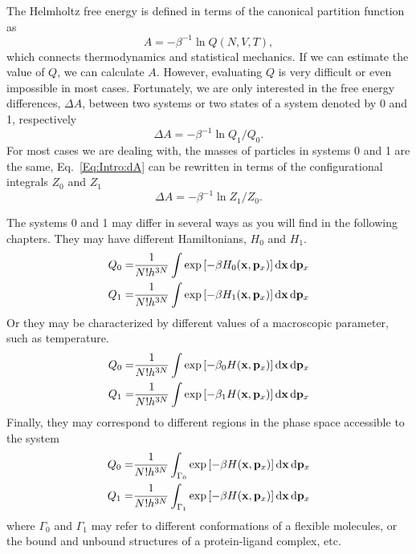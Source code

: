 The Helmholtz free energy is defined in terms of the canonical partition function as
\begin{equation}
A=-\beta^{-1}\ln{Q(N,V,T)},
\end{equation}
which connects thermodynamics and statistical mechanics. If we can estimate the value of $Q$, we can calculate $A$. However, evaluating $Q$ is very difficult or even impossible in most cases. Fortunately, we are only interested in the free energy differences, $\Delta A$, between two systems or two states of a system denoted by 0 and 1, respectively
\begin{equation}
\Delta A=-\beta^{-1}\ln{Q_1/Q_0}.
\label{Eq:Intro:dA}
\end{equation}
For most cases we are dealing with, the masses of particles in systems 0 and 1 are the same, Eq.~\ref{Eq:Intro:dA} can be rewritten in terms of the configurational integrals $Z_0$ and $Z_1$
\begin{equation}
\Delta A=-\beta^{-1}\ln{Z_1/Z_0}.
\end{equation}

The systems 0 and 1 may differ in several ways as you will find in the following chapters. They may have different Hamiltonians, $H_0$ and $H_1$. 
\begin{align}
	Q_0=&\frac{1}{N!h^{3N}}\int\exp{\left[-\beta H_0(\mathbf{x},\mathbf{p}_x)\right]}\mathop{}\!\mathrm{d} \mathbf{x}\mathop{}\!\mathrm{d} \mathbf{p}_x\\
	Q_1=&\frac{1}{N!h^{3N}}\int\exp{\left[-\beta H_1(\mathbf{x},\mathbf{p}_x)\right]}\mathop{}\!\mathrm{d} \mathbf{x}\mathop{}\!\mathrm{d} \mathbf{p}_x
\end{align}
Or they may be characterized by different values of a macroscopic parameter, such as temperature. 
\begin{align}
	Q_0=&\frac{1}{N!h^{3N}}\int\exp{\left[-\beta_0 H(\mathbf{x},\mathbf{p}_x)\right]}\mathop{}\!\mathrm{d} \mathbf{x}\mathop{}\!\mathrm{d} \mathbf{p}_x\\
	Q_1=&\frac{1}{N!h^{3N}}\int\exp{\left[-\beta_1 H(\mathbf{x},\mathbf{p}_x)\right]}\mathop{}\!\mathrm{d} \mathbf{x}\mathop{}\!\mathrm{d} \mathbf{p}_x
\end{align}
Finally, they may correspond to different regions in the phase space accessible to the system
\begin{align}
Q_0=&\frac{1}{N!h^{3N}}\int_{\Gamma_0}\exp{\left[-\beta H(\mathbf{x},\mathbf{p}_x)\right]}\mathop{}\!\mathrm{d} \mathbf{x}\mathop{}\!\mathrm{d} \mathbf{p}_x\\
Q_1=&\frac{1}{N!h^{3N}}\int_{\Gamma_1}\exp{\left[-\beta H(\mathbf{x},\mathbf{p}_x)\right]}\mathop{}\!\mathrm{d} \mathbf{x}\mathop{}\!\mathrm{d} \mathbf{p}_x
\end{align}
where $\Gamma_0$ and $\Gamma_1$ may refer to different conformations of a flexible molecules, or the bound and unbound structures of a protein-ligand complex, etc.


